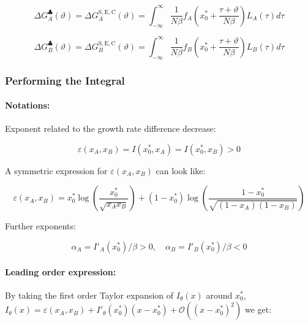 \documentclass{article}
\theoremstyle{definition}
\begin{document}
\begin{equation}
    \Delta G_A^\clubsuit(\vartheta) = \Delta G_A^\mathrm{S,E,C}(\vartheta) = \int_{-\infty}^\infty 
    \frac{1}{N \beta} f_A \left ( x_0^* + \frac{\tau + \vartheta}{N \beta} \right ) L_A(\tau) d\tau
\end{equation}

\begin{equation}
    \Delta G_B^\clubsuit(\vartheta) = \Delta G_B^\mathrm{S,E,C}(\vartheta) = \int_{-\infty}^\infty 
    \frac{1}{N \beta} f_B \left ( x_0^* + \frac{\tau + \vartheta}{N \beta} \right ) L_B(\tau) d\tau
\end{equation}

\subsubsection{Performing the Integral}

\paragraph{Notations:}

Exponent related to the growth rate difference decrease:

\begin{equation}
    \varepsilon(x_A,x_B) = I(x_0^*,x_A) = I(x_0^*,x_B) > 0
\end{equation}

A symmetric expression for $\varepsilon(x_A,x_B)$ can look like:

\begin{equation}
    \varepsilon(x_A,x_B) = x_0^* \log
    \left (
    \frac{x_0^*}{\sqrt{x_A x_B}}
    \right ) +
    (1-x_0^*) \log
    \left (
    \frac{1-x_0^*}{\sqrt{(1-x_A) (1-x_B)}}
    \right )
\end{equation}

Further exponents:

\begin{equation}
    \alpha_A = I'_A(x_0^*)/\beta > 0, \quad
    \alpha_B = I'_B(x_0^*)/\beta < 0
\end{equation}

\paragraph{Leading order expression:}

By taking the first order Taylor expansion of $I_\theta(x)$ around $x_0^*$, $I_\theta(x) = \varepsilon(x_A,x_B) + I'_\theta(x_0^*) (x-x_0^*) + \mathcal{O}((x-x_0^*)^2)$ we get:
\end{document}
